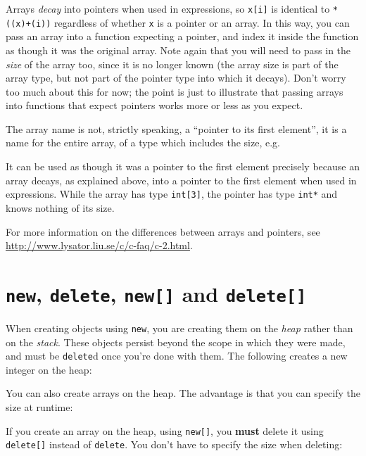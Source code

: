 \documentclass[a4paper]{scrartcl}
\begin{document}
Arrays \emph{decay} into pointers when used in expressions, so \verb|x[i]| is identical to \verb|*((x)+(i))| regardless of whether \verb|x| is a pointer or an array. In this way, you can pass an array into a function expecting a pointer, and index it inside the function as though it was the original array. Note again that you will need to pass in the \emph{size} of the array too, since it is no longer known (the array size is part of the array type, but not part of the pointer type into which it decays). Don't worry too much about this for now; the point is just to illustrate that passing arrays into functions that expect pointers works more or less as you expect.

The array name is not, strictly speaking, a ``pointer to its first element'', it is a name for the entire array, of a type which includes the size, e.g.



It can be used as though it was a pointer to the first element precisely because an array decays, as explained above, into a pointer to the first element when used in expressions. While the array has type \verb|int[3]|, the pointer has type \verb|int*| and knows nothing of its size.

For more information on the differences between arrays and pointers, see \url{http://www.lysator.liu.se/c/c-faq/c-2.html}.

\section{\texttt{new}, \texttt{delete}, \texttt{new[]} and \texttt{delete[]}}
When creating objects using \verb|new|, you are creating them on the \emph{heap} rather than on the \emph{stack}. These objects persist beyond the scope in which they were made, and must be \verb|delete|d once you're done with them. The following creates a new integer on the heap:



You can also create arrays on the heap. The advantage is that you can specify the size at runtime:



If you create an array on the heap, using \verb|new[]|, you \textbf{must} delete it using \verb|delete[]| instead of \verb|delete|. You don't have to specify the size when deleting:


\end{document}
